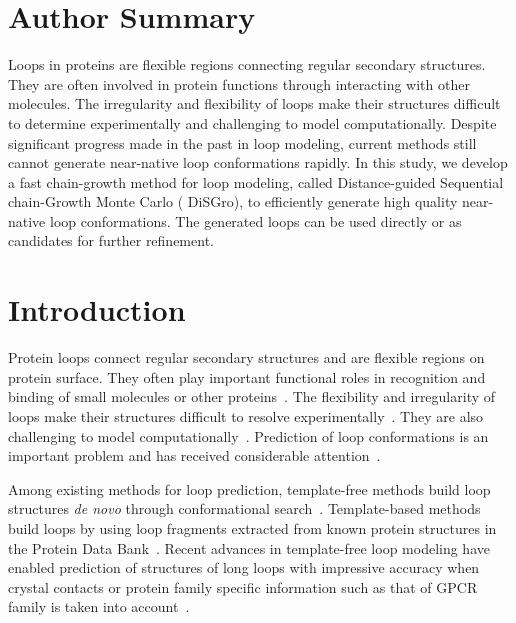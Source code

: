 \section*{Author Summary}
Loops in proteins are flexible regions connecting regular secondary
structures. They are often involved in protein functions through
interacting with other molecules. The irregularity and flexibility
of loops make their structures difficult to determine experimentally
and challenging to model computationally.  Despite significant
progress made in the past in loop modeling, current methods still
cannot generate near-native loop conformations rapidly.  In this
study, we develop a fast chain-growth method for loop modeling,
called Distance-guided Sequential chain-Growth Monte Carlo ({\sc
DiSGro}), to efficiently generate high quality near-native loop
conformations.  The generated loops can be used directly or as
candidates for further refinement.



\section*{Introduction}
Protein loops connect regular secondary structures and are flexible
regions on protein surface. They often play important functional
roles in recognition and binding of small molecules or other
proteins~\cite{bajorath1996,streaker1999,myllykoski2012}. The
flexibility and irregularity of loops make their structures
difficult to resolve experimentally~\cite{lotan2004}. They are also
challenging to model computationally~\cite{fiser2000,sellers2008}.
Prediction of loop conformations is an important problem and has
received considerable
attention~\cite{van1997,fiser2000,canutescu2003,de2003,depristo2003,michalsky2003,coutsias2004,jacobson2004,zhu2006,zhang2007a,cui2008,sellers2008,spassov2008,liu2009,hildebrand2009,karmali2009,mandell2009,lee2010,zhao2011,arnautova2011,goldfeld2011,subramani2012,fernandez2013}.

Among existing methods for loop prediction, template-free methods
build loop structures {\it de novo}\/ through conformational
search~\cite{bruccoleri1987,van1997,fiser2000,de2003,depristo2003,jacobson2004,zhu2006,sellers2008,spassov2008,liu2009,mandell2009,zhao2011}.
Template-based methods build loops by using loop fragments extracted
from known protein structures in the Protein Data
Bank~\cite{michalsky2003,hildebrand2009,fernandez2013}. Recent
advances in template-free loop modeling have enabled prediction of
structures of long loops with impressive accuracy when crystal
contacts or protein family specific information such as that of GPCR
family is taken into account~\cite{zhu2006,zhao2011,goldfeld2011}.

